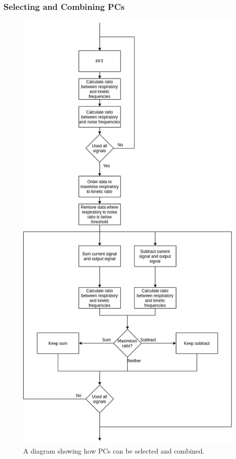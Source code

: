                 \subsubsection{Selecting and Combining PCs} \label{sec:pca_data_driven_surrogate_signal_extraction_methods_for_dynamic_pet_methods_selecting_and_combining_pcs}
                    \begin{figure}
                        \centering
                        
                        \includegraphics[width=0.7\linewidth]{figures/data_driven_surrogate_signal_extraction_methods_1_select_and_combine.png}
                        
                        \captionsetup{singlelinecheck=false, justification=centering}
                        \caption{A diagram showing how \glspl{PC} can be selected and combined.}
                        \label{fig:pca_data_driven_surrogate_signal_extraction_methods_for_dynamic_pet_methods_select_and_combine}
                    \end{figure}
                
